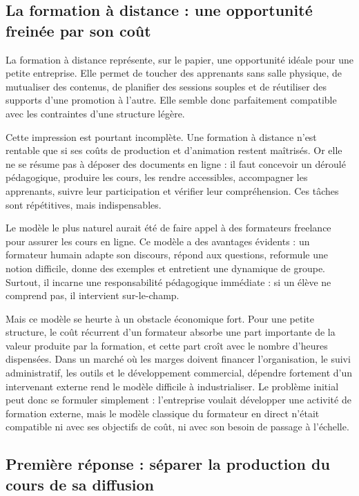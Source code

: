 \subsection{La formation à distance : une opportunité freinée par son coût}

La formation à distance représente, sur le papier, une opportunité idéale pour une petite
entreprise. Elle permet de toucher des apprenants sans salle physique, de mutualiser des
contenus, de planifier des sessions souples et de réutiliser des supports d'une promotion à
l'autre. Elle semble donc parfaitement compatible avec les contraintes d'une structure
légère.

Cette impression est pourtant incomplète. Une formation à distance n'est rentable que si
ses coûts de production et d'animation restent maîtrisés. Or elle ne se résume pas à
déposer des documents en ligne : il faut concevoir un déroulé pédagogique, produire les
cours, les rendre accessibles, accompagner les apprenants, suivre leur participation et
vérifier leur compréhension. Ces tâches sont répétitives, mais indispensables.

Le modèle le plus naturel aurait été de faire appel à des formateurs freelance pour
assurer les cours en ligne. Ce modèle a des avantages évidents : un formateur humain
adapte son discours, répond aux questions, reformule une notion difficile, donne des
exemples et entretient une dynamique de groupe. Surtout, il incarne une responsabilité
pédagogique immédiate : si un élève ne comprend pas, il intervient sur-le-champ.

Mais ce modèle se heurte à un obstacle économique fort. Pour une petite structure, le coût
récurrent d'un formateur absorbe une part importante de la valeur produite par la
formation, et cette part croît avec le nombre d'heures dispensées. Dans un marché où les
marges doivent financer l'organisation, le suivi administratif, les outils et le
développement commercial, dépendre fortement d'un intervenant externe rend le modèle
difficile à industrialiser. Le problème initial peut donc se formuler simplement :
l'entreprise voulait développer une activité de formation externe, mais le modèle
classique du formateur en direct n'était compatible ni avec ses objectifs de coût, ni avec
son besoin de passage à l'échelle.

\subsection{Première réponse : séparer la production du cours de sa diffusion}

